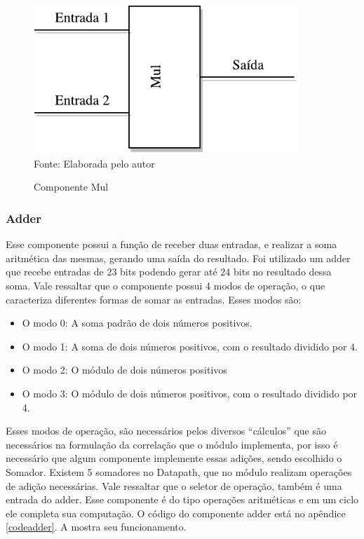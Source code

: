 \begin{figure}[H]
	\centering
	\caption{Componente Mul}
	\includegraphics[width=10cm]{figures/Mul.pdf}\\
	
	{Fonte: Elaborada pelo autor}
	\label{Mul}
\end{figure}



\subsubsection{Adder}
Esse componente possui a função de receber duas entradas, e realizar a soma aritmética das mesmas, gerando uma saída do resultado. Foi utilizado um adder que recebe entradas de 23 bits podendo gerar até 24 bits no resultado dessa soma. Vale ressaltar que o componente possui 4 modos de operação, o que caracteriza diferentes formas de somar as entradas. Esses modos são:
\begin{itemize}
	\item O modo 0: A soma padrão de dois números positivos.
	\item O modo 1: A soma de dois números positivos, com o resultado dividido por 4.
	\item O modo 2: O módulo de dois números positivos
	\item O modo 3: O módulo de dois números positivos, com o resultado dividido por 4.
\end{itemize}

Esses modos de operação, são necessários pelos diversos “cálculos” que são necessários na formulação da correlação que o módulo implementa, por isso  é necessário que algum componente implemente essas adições, sendo escolhido o Somador.
Existem 5 somadores no Datapath, que no módulo realizam operações de adição necessárias. Vale ressaltar que o seletor de operação, também é uma entrada do adder. Esse componente é do tipo operações aritméticas e em um ciclo ele completa sua computação. O código do componente adder está no apêndice \ref{codeadder}. A  mostra seu funcionamento.

